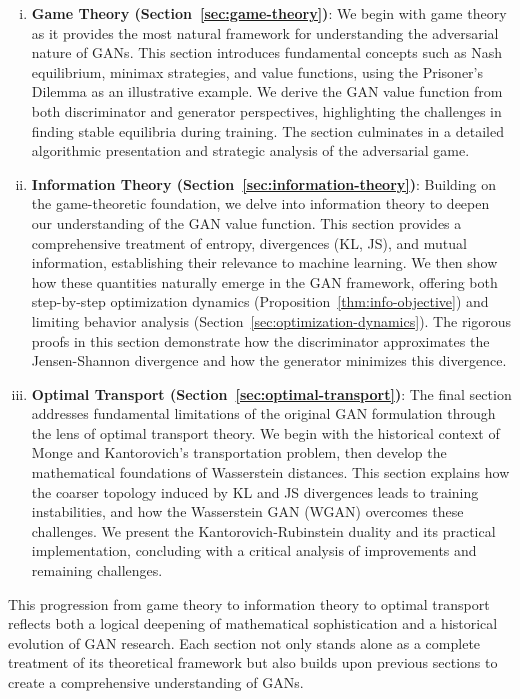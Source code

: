 \begin{enumerate}[(i)]
\item \textbf{Game Theory (Section~\ref{sec:game-theory})}: 
  We begin with game theory as it provides the most natural framework for understanding the adversarial nature of GANs. This section introduces fundamental concepts such as Nash equilibrium, minimax strategies, and value functions, using the Prisoner's Dilemma as an illustrative example. We derive the GAN value function from both discriminator and generator perspectives, highlighting the challenges in finding stable equilibria during training. The section culminates in a detailed algorithmic presentation and strategic analysis of the adversarial game.

\item \textbf{Information Theory (Section~\ref{sec:information-theory})}:
  Building on the game-theoretic foundation, we delve into information theory to deepen our understanding of the GAN value function. This section provides a comprehensive treatment of entropy, divergences (KL, JS), and mutual information, establishing their relevance to machine learning. We then show how these quantities naturally emerge in the GAN framework, offering both step-by-step optimization dynamics (Proposition~\ref{thm:info-objective}) and limiting behavior analysis (Section~\ref{sec:optimization-dynamics}). The rigorous proofs in this section demonstrate how the discriminator approximates the Jensen-Shannon divergence and how the generator minimizes this divergence.

\item \textbf{Optimal Transport (Section~\ref{sec:optimal-transport})}:
  The final section addresses fundamental limitations of the original GAN formulation through the lens of optimal transport theory. We begin with the historical context of Monge and Kantorovich's transportation problem, then develop the mathematical foundations of Wasserstein distances. This section explains how the coarser topology induced by KL and JS divergences leads to training instabilities, and how the Wasserstein GAN (WGAN) overcomes these challenges. We present the Kantorovich-Rubinstein duality and its practical implementation, concluding with a critical analysis of improvements and remaining challenges.
\end{enumerate}

This progression from game theory to information theory to optimal transport reflects both a logical deepening of mathematical sophistication and a historical evolution of GAN research. Each section not only stands alone as a complete treatment of its theoretical framework but also builds upon previous sections to create a comprehensive understanding of GANs.

